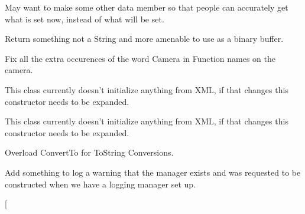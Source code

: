 \begin{DoxyRefList}
\item[\label{todo__todo000008}%
\hypertarget{todo__todo000008}{}%
Member \hyperlink{classMezzanine_1_1AudioManager_a48ad7f946649a3971e52a3d9bf3aba20}{Mezzanine\-:\-:Audio\-Manager\-:\-:Apply\-Setting\-Group\-Impl} (Object\-Setting\-Group $\ast$\-Group)]May want to make some other data member so that people can accurately get what is set now, instead of what will be set.  
\item[\label{todo__todo000011}%
\hypertarget{todo__todo000011}{}%
Member \hyperlink{namespaceMezzanine_1_1BinaryTools_a5d589d15b7cf318b1759487b0d3e6de4}{Mezzanine\-:\-:Binary\-Tools\-:\-:Base64\-Decode} (String const \&Encoded\-String)]Return something not a String and more amenable to use as a binary buffer.  
\item[\label{todo__todo000012}%
\hypertarget{todo__todo000012}{}%
Class \hyperlink{classMezzanine_1_1Camera}{Mezzanine\-:\-:Camera} ]Fix all the extra occurences of the word Camera in Function names on the camera.  
\item[\label{todo__todo000013}%
\hypertarget{todo__todo000013}{}%
Member \hyperlink{classMezzanine_1_1CameraManager_a426dd240a72299e1b5f6e69ca2859542}{Mezzanine\-:\-:Camera\-Manager\-:\-:Camera\-Manager} (X\-M\-L\-::\-Node \&X\-M\-L\-Node)]This class currently doesn't initialize anything from X\-M\-L, if that changes this constructor needs to be expanded.  
\item[\label{todo__todo000016}%
\hypertarget{todo__todo000016}{}%
Member \hyperlink{classMezzanine_1_1CollisionShapeManager_a33671dfe83da86a6abbb172ff8a679f8}{Mezzanine\-:\-:Collision\-Shape\-Manager\-:\-:Collision\-Shape\-Manager} (X\-M\-L\-::\-Node \&X\-M\-L\-Node)]This class currently doesn't initialize anything from X\-M\-L, if that changes this constructor needs to be expanded.  
\item[\label{todo__todo000020}%
\hypertarget{todo__todo000020}{}%
Member \hyperlink{namespaceMezzanine_a36fefd8e3d822274f02c7633b0ef5072}{Mezzanine\-:\-:Convert\-To} (const From \&Datum)]Overload Convert\-To for To\-String Conversions.  
\item[\label{todo__todo000002}%
\hypertarget{todo__todo000002}{}%
Member \hyperlink{classMezzanine_1_1DefaultActorManagerFactory_ace07bebd9a19ecafa99ca647855b308e}{Mezzanine\-:\-:Default\-Actor\-Manager\-Factory\-:\-:Create\-Manager} (Name\-Value\-Pair\-List \&Params)]Add something to log a warning that the manager exists and was requested to be constructed when we have a logging manager set up.  
\item[\label{todo__todo000003}%

\end{DoxyRefList}
